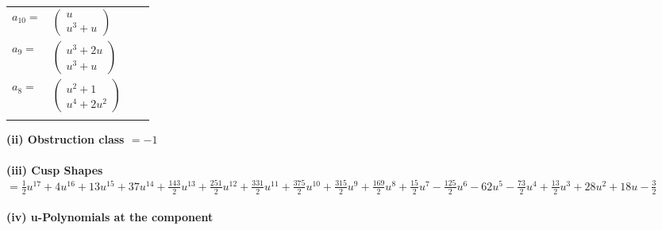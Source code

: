 \documentclass[1p]{elsarticle_modified}
\theoremstyle{definition}
\begin{document}
\begin{tabular}{m{7pt} m{180pt} m{7pt} m{180pt} }
\flushright $a_{10}=$&$\begin{pmatrix}u\\u^3+u\end{pmatrix}$ \\
\flushright $a_{9}=$&$\begin{pmatrix}u^3+2 u\\u^3+u\end{pmatrix}$ \\
\flushright $a_{8}=$&$\begin{pmatrix}u^2+1\\u^4+2 u^2\end{pmatrix}$\\&\end{tabular}
\flushleft \textbf{(ii) Obstruction class $= -1$}\\~\\
\flushleft \textbf{(iii) Cusp Shapes $= \frac{1}{2} u^{17}+4 u^{16}+13 u^{15}+37 u^{14}+\frac{143}{2} u^{13}+\frac{251}{2} u^{12}+\frac{331}{2} u^{11}+\frac{375}{2} u^{10}+\frac{315}{2} u^9+\frac{169}{2} u^8+\frac{15}{2} u^7-\frac{125}{2} u^6-62 u^5-\frac{73}{2} u^4+\frac{13}{2} u^3+28 u^2+18 u-\frac{3}{2}$}\\~\\
\newpage\renewcommand{\arraystretch}{1}
\flushleft \textbf{(iv) u-Polynomials at the component}\newline \\
\end{document}
